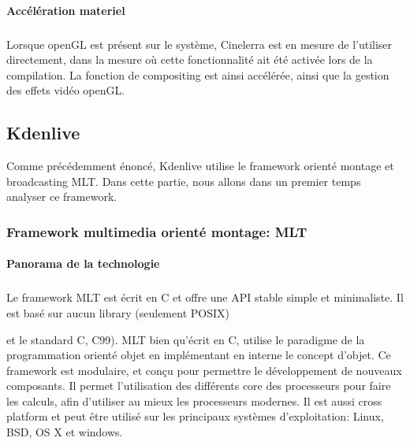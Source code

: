 \paragraph{Accélération materiel}

\subparagraph{}

Lorsque openGL est présent sur le système, Cinelerra
est en mesure de l'utiliser directement, dans la mesure où cette
fonctionnalité ait été activée lors de la compilation.  La fonction
de compositing est ainsi accélérée, ainsi que la gestion des effets
vidéo openGL.





\subsection {Kdenlive}

Comme précédemment énoncé, Kdenlive utilise le framework orienté
montage et broadcasting MLT. Dans cette partie, nous allons dans un
premier temps analyser ce framework.

\subsubsection {Framework multimedia orienté montage: MLT}

\paragraph {Panorama de la technologie} %

\subparagraph{}

Le framework MLT est écrit en C et offre une API stable
simple et minimaliste. Il est basé sur aucun library (seulement POSIX)

 et le standard C, C99). MLT bien
qu'écrit en C, utilise le paradigme de la programmation orienté objet en
implémentant en interne le concept d'objet. Ce framework est modulaire,
et conçu pour permettre le développement de nouveaux composants. Il
permet l'utilisation des différents core des processeurs pour faire
les calculs, afin d'utiliser au mieux les processeurs modernes. Il est
aussi cross platform et peut être utilisé sur les principaux systèmes
d'exploitation: Linux, BSD, OS X et windows.


